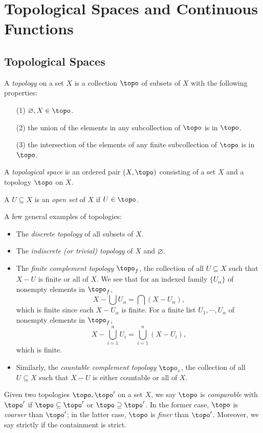 \section{Topological Spaces and Continuous Functions}

\subsection{Topological Spaces}
\begin{definition}\label{2.1}
    A {\it topology} on a set $X$ is a collection $\topo$ of subsets of $X$ with the following properties:
    \begin{enumerate}
        \item[(1)] $\varnothing, X \in \topo$.
        \item[(2)] the union of the elements in any subcollection of $\topo$ is in $\topo$.
        \item[(3)] the intersection of the elements of any finite subcollection of $\topo$ is in $\topo$.
    \end{enumerate}
    A {\it topological space} is an ordered pair $(X, \topo)$ consisting of a set $X$ and a topology $\topo$ on $X$.

    A $U \subseteq X$ is an {\it open set} of $X$ if $U \in \topo$.
\end{definition}

A few general examples of topologies:
\begin{itemize}
    \item The {\it discrete topology} of all subsets of $X$. 
    \item The {\it indiscrete (or trivial) topology} of $X$ and $\varnothing$.
    \item The {\it finite complement topology} $\topo_f$, the collection of all $U \subseteq X$ such that $X - U$ is finite or all of $X$. We see that for an indexed family $\{U_\alpha\}$ of nonempty elements in $\topo_f$,
    $$X - \bigcup U_\alpha = \bigcap (X - U_\alpha),$$
    which is finite since each $X - U_\alpha$ is finite. For a finite list $U_1, \cdots, U_n$ of nonempty elements in $\topo_f$,
    $$X - \bigcup_{i=1}^n U_i = \bigcup_{i=1}^n (X- U_i),$$
    which is finite.
    \item Similarly, the {\it countable complement topology} $\topo_c$, the collection of all $U \subseteq X$ such that $X - U$ is either countable or all of $X$.
\end{itemize}

Given two topologies $\topo, \topo'$ on a set $X$, we say $\topo$ is {\it comparable} with $\topo'$ if $\topo \subseteq \topo'$ or $\topo \supseteq \topo'$. In the former case, $\topo$ is {\it coarser} than $\topo'$; in the latter case, $\topo$ is {\it finer} than $\topo'$. Moreover, we say strictly if the containment is strict.

